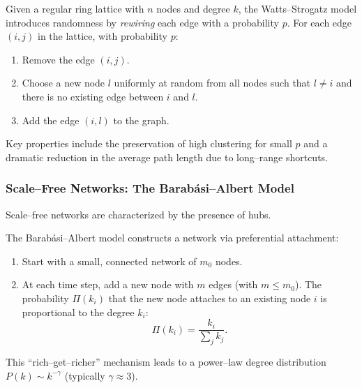 \documentclass[11pt, headings=standardclasses, parskip=half, twoside]{scrartcl}
\begin{document}
\begin{definition}\label{def:WS}
Given a regular ring lattice with \(n\) nodes and degree \(k\), the Watts–Strogatz model introduces randomness by \emph{rewiring} each edge with a probability \(p\). 
For each edge \((i,j)\) in the lattice, with probability \(p\):
\begin{enumerate}[label=\arabic*., before={\parskip = 0em}, nosep]
  \item Remove the edge \((i,j)\).
  \item Choose a new node \(l\) uniformly at random from all nodes such that \(l \neq i\) and there is no existing edge between \(i\) and \(l\).
  \item Add the edge \((i,l)\) to the graph. \qedhere
\end{enumerate} 
\end{definition}

Key properties include the preservation of high clustering for small \(p\) and a dramatic reduction in the average path length due to long–range shortcuts.

\subsubsection{Scale–Free Networks: The Barabási–Albert Model}\label{subsubsec:BA}
Scale–free networks are characterized by the presence of hubs.

\begin{definition}\label{def:BA}
The Barabási–Albert model constructs a network via preferential attachment:
\begin{enumerate}[label=\arabic*.]
  \item Start with a small, connected network of \(m_0\) nodes.
  \item At each time step, add a new node with \(m\) edges (with \(m\le m_0\)). The probability \(\Pi(k_i)\) that the new node attaches to an existing node \(i\) is proportional to the degree \(k_i\):
  \[
  \Pi(k_i)=\frac{k_i}{\sum_j k_j}.
  \] \qedhere
\end{enumerate}
\end{definition}

This “rich–get–richer” mechanism leads to a power–law degree distribution \(P(k)\sim k^{-\gamma}\) (typically \(\gamma\approx 3\)).
\end{document}
